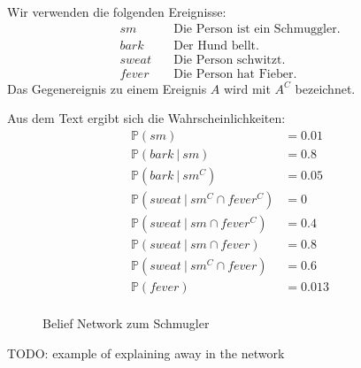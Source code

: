 \documentclass[a4paper]{scrartcl}
\newcommand{\prob}{\mathbb{P}}
\begin{document}
Wir verwenden die folgenden Ereignisse:
\begin{align*}
    sm &\quad \text{Die Person ist ein Schmuggler.} \\
    bark &\quad \text{Der Hund bellt.} \\
    sweat &\quad \text{Die Person schwitzt.} \\
    fever &\quad \text{Die Person hat Fieber.}
\end{align*}
Das Gegenereignis zu einem Ereignis $A$ wird mit $A^C$ bezeichnet.

Aus dem Text ergibt sich die Wahrscheinlichkeiten:
\begin{align*}
    \prob(sm) &= \num{0,01} \\
    \prob(bark\ |\ sm) &= \num{0,8} \\
    \prob(bark\ |\ sm^C) &= \num{0,05} \\
    \prob(sweat\ |\ sm^C \cap fever^C) &= \num{0} \\
    \prob(sweat\ |\ sm \cap fever^C) &= \num{0.4} \\
    \prob(sweat\ |\ sm \cap fever) &= \num{0.8} \\
    \prob(sweat\ |\ sm^C \cap fever) &= \num{0.6} \\
    \prob(fever) &= \num{0,013} \\
\end{align*}

\begin{figure}[h]
    \centering
    \caption{Belief Network zum Schmugler}
\end{figure}

TODO: example of explaining away in the network
\end{document}
